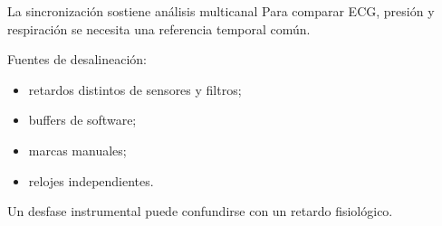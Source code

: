 \documentclass[
  ignorenonframetext,
  aspectratio=169,
  spanish,
]{beamer}
\providecommand{\faExclamation}{\faIcon{exclamation}}
\providecommand{\tightlist}{%
  \setlength{\itemsep}{0pt}\setlength{\parskip}{0pt}}
\begin{document}
\begin{frame}{La sincronización sostiene análisis multicanal}
  \protect{}\label{la-sincronizaciuxf3n-sostiene-anuxe1lisis-multicanal}
  Para comparar ECG, presión y respiración se necesita una referencia
  temporal común.

  Fuentes de desalineación:

  \begin{itemize}
    \tightlist
    \item
          retardos distintos de sensores y filtros;
    \item
          buffers de software;
    \item
          marcas manuales;
    \item
          relojes independientes.
  \end{itemize}

  \begin{tcolorbox}[enhanced jigsaw, arc=.35mm, bottomrule=.15mm, bottomtitle=1mm, breakable, colback=white, colbacktitle=quarto-callout-important-color!10!white, colframe=quarto-callout-important-color-frame, coltitle=black, left=2mm, leftrule=.75mm, opacityback=0, opacitybacktitle=0.6, rightrule=.15mm, title=\textcolor{quarto-callout-important-color}{\faExclamation}\hspace{0.5em}{Importante}, titlerule=0mm, toprule=.15mm, toptitle=1mm]

    Un desfase instrumental puede confundirse con un retardo fisiológico.

  \end{tcolorbox}
\end{frame}
\end{document}
